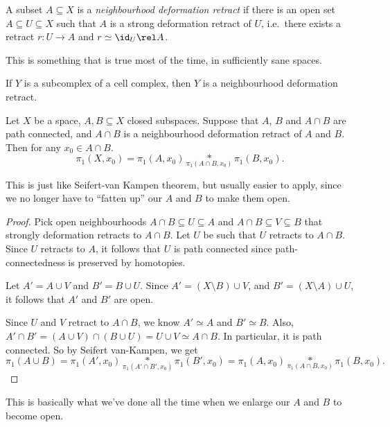 \documentclass[a4paper]{article}
\begin{document}
\begin{defi}
  A subset $A\subseteq X$ is a \emph{neighbourhood deformation retract} if there is an open set $A\subseteq U\subseteq X$ such that $A$ is a strong deformation retract of $U$, i.e.\ there exists a retract $r: U \to A$ and $r \simeq \id_U \rel A$.
\end{defi}
This is something that is true most of the time, in sufficiently sane spaces.

\begin{eg}
  If $Y$ is a subcomplex of a cell complex, then $Y$ is a neighbourhood deformation retract.
\end{eg}

\begin{thm}
  Let $X$ be a space, $A, B\subseteq X$ closed subspaces. Suppose that $A$, $B$ and $A\cap B$ are path connected, and $A\cap B$ is a neighbourhood deformation retract of $A$ and $B$. Then for any $x_0 \in A\cap B$.
  \[
    \pi_1(X, x_0) = \pi_1(A, x_0) \underset{\pi_1(A\cap B, x_0)}{*} \pi_1(B, x_0).
  \]
\end{thm}
\begin{center}
\end{center}
This is just like Seifert-van Kampen theorem, but usually easier to apply, since we no longer have to ``fatten up'' our $A$ and $B$ to make them open.

\begin{proof}
  Pick open neighbourhoods $A\cap B \subseteq U \subseteq A$ and $A \cap B \subseteq V \subseteq B$ that strongly deformation retracts to $A\cap B$. Let $U$ be such that $U$ retracts to $A \cap B$. Since $U$ retracts to $A$, it follows that $U$ is path connected since path-connectedness is preserved by homotopies.

  Let $A' = A \cup V$ and $B' = B \cup U$. Since $A' = (X \setminus B) \cup V$, and $B' = (X \setminus A) \cup U$, it follows that $A'$ and $B'$ are open.

  Since $U$ and $V$ retract to $A \cap B$, we know $A' \simeq A$ and $B' \simeq B$. Also, $A' \cap B' = (A \cup V) \cap (B \cup U) = U \cup V \simeq A \cap B$. In particular, it is path connected. So by Seifert van-Kampen, we get
  \[
    \pi_1(A \cup B) = \pi_1(A', x_0) \underset{\pi_1(A' \cap B', x_0)}{*} \pi_1(B', x_0) = \pi_1(A, x_0) \underset{\pi_1(A\cap B, x_0)}{*} \pi_1(B, x_0).
  \]
\end{proof}
This is basically what we've done all the time when we enlarge our $A$ and $B$ to become open.
\end{document}
